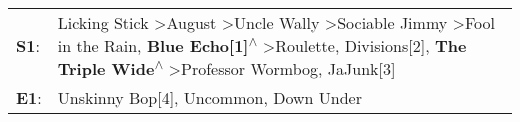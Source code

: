 \begin{supertabular}{p{0.03\textwidth}p{0.92\textwidth}}
 \textbf{S1}:  &  Licking Stick\textsuperscript{} \textgreater \enspace August\textsuperscript{} \textgreater \enspace Uncle Wally\textsuperscript{} \textgreater \enspace Sociable Jimmy\textsuperscript{} \textgreater \enspace Fool in the Rain\textsuperscript{}, \enspace \textbf{Blue Echo[1]\textsuperscript{$\wedge$}} \textgreater \enspace Roulette\textsuperscript{}, \enspace Divisions[2]\textsuperscript{}, \enspace \textbf{The Triple Wide\textsuperscript{$\wedge$}} \textgreater \enspace Professor Wormbog\textsuperscript{}, \enspace JaJunk[3]\textsuperscript{}  \enspace  \\
 \textbf{E1}:  &                                                                                                                                                                                                                                                                                                                                                                                                                                                        Unskinny Bop[4]\textsuperscript{}, \enspace Uncommon\textsuperscript{}, \enspace Down Under\textsuperscript{}  \enspace  \\
\end{supertabular}
